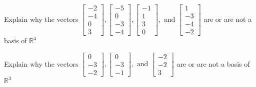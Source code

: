 \documentclass{article}
\begin{document}
\begin{exerciseStatement}
    Explain why the vectors \(\left[\begin{array}{r}
-2 \\
-4 \\
0 \\
3
\end{array}\right] , \left[\begin{array}{r}
-5 \\
0 \\
-3 \\
-4
\end{array}\right] , \left[\begin{array}{r}
-1 \\
1 \\
3 \\
0
\end{array}\right] , \text{ and } \left[\begin{array}{r}
1 \\
-3 \\
-4 \\
-2
\end{array}\right]\) are or are not a basis of \(\mathbb{R}^4\)


  
\end{exerciseStatement}

\begin{exerciseStatement}
    Explain why the vectors \(\left[\begin{array}{r}
0 \\
-3 \\
-2
\end{array}\right] , \left[\begin{array}{r}
0 \\
-3 \\
-1
\end{array}\right] , \text{ and } \left[\begin{array}{r}
-2 \\
-2 \\
3
\end{array}\right]\) are or are not a basis of \(\mathbb{R}^3\)


  
\end{exerciseStatement}
\end{document}
